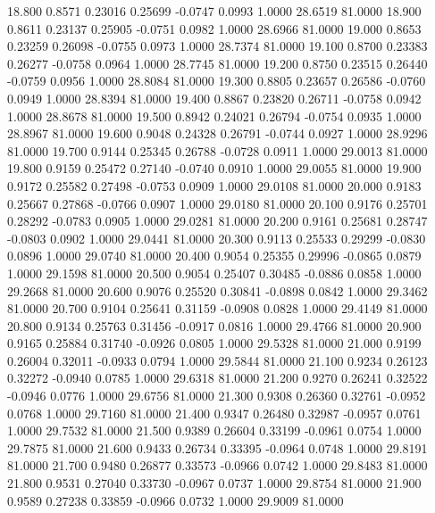   18.800   0.8571   0.23016   0.25699  -0.0747   0.0993   1.0000  28.6519  81.0000
  18.900   0.8611   0.23137   0.25905  -0.0751   0.0982   1.0000  28.6966  81.0000
  19.000   0.8653   0.23259   0.26098  -0.0755   0.0973   1.0000  28.7374  81.0000
  19.100   0.8700   0.23383   0.26277  -0.0758   0.0964   1.0000  28.7745  81.0000
  19.200   0.8750   0.23515   0.26440  -0.0759   0.0956   1.0000  28.8084  81.0000
  19.300   0.8805   0.23657   0.26586  -0.0760   0.0949   1.0000  28.8394  81.0000
  19.400   0.8867   0.23820   0.26711  -0.0758   0.0942   1.0000  28.8678  81.0000
  19.500   0.8942   0.24021   0.26794  -0.0754   0.0935   1.0000  28.8967  81.0000
  19.600   0.9048   0.24328   0.26791  -0.0744   0.0927   1.0000  28.9296  81.0000
  19.700   0.9144   0.25345   0.26788  -0.0728   0.0911   1.0000  29.0013  81.0000
  19.800   0.9159   0.25472   0.27140  -0.0740   0.0910   1.0000  29.0055  81.0000
  19.900   0.9172   0.25582   0.27498  -0.0753   0.0909   1.0000  29.0108  81.0000
  20.000   0.9183   0.25667   0.27868  -0.0766   0.0907   1.0000  29.0180  81.0000
  20.100   0.9176   0.25701   0.28292  -0.0783   0.0905   1.0000  29.0281  81.0000
  20.200   0.9161   0.25681   0.28747  -0.0803   0.0902   1.0000  29.0441  81.0000
  20.300   0.9113   0.25533   0.29299  -0.0830   0.0896   1.0000  29.0740  81.0000
  20.400   0.9054   0.25355   0.29996  -0.0865   0.0879   1.0000  29.1598  81.0000
  20.500   0.9054   0.25407   0.30485  -0.0886   0.0858   1.0000  29.2668  81.0000
  20.600   0.9076   0.25520   0.30841  -0.0898   0.0842   1.0000  29.3462  81.0000
  20.700   0.9104   0.25641   0.31159  -0.0908   0.0828   1.0000  29.4149  81.0000
  20.800   0.9134   0.25763   0.31456  -0.0917   0.0816   1.0000  29.4766  81.0000
  20.900   0.9165   0.25884   0.31740  -0.0926   0.0805   1.0000  29.5328  81.0000
  21.000   0.9199   0.26004   0.32011  -0.0933   0.0794   1.0000  29.5844  81.0000
  21.100   0.9234   0.26123   0.32272  -0.0940   0.0785   1.0000  29.6318  81.0000
  21.200   0.9270   0.26241   0.32522  -0.0946   0.0776   1.0000  29.6756  81.0000
  21.300   0.9308   0.26360   0.32761  -0.0952   0.0768   1.0000  29.7160  81.0000
  21.400   0.9347   0.26480   0.32987  -0.0957   0.0761   1.0000  29.7532  81.0000
  21.500   0.9389   0.26604   0.33199  -0.0961   0.0754   1.0000  29.7875  81.0000
  21.600   0.9433   0.26734   0.33395  -0.0964   0.0748   1.0000  29.8191  81.0000
  21.700   0.9480   0.26877   0.33573  -0.0966   0.0742   1.0000  29.8483  81.0000
  21.800   0.9531   0.27040   0.33730  -0.0967   0.0737   1.0000  29.8754  81.0000
  21.900   0.9589   0.27238   0.33859  -0.0966   0.0732   1.0000  29.9009  81.0000
